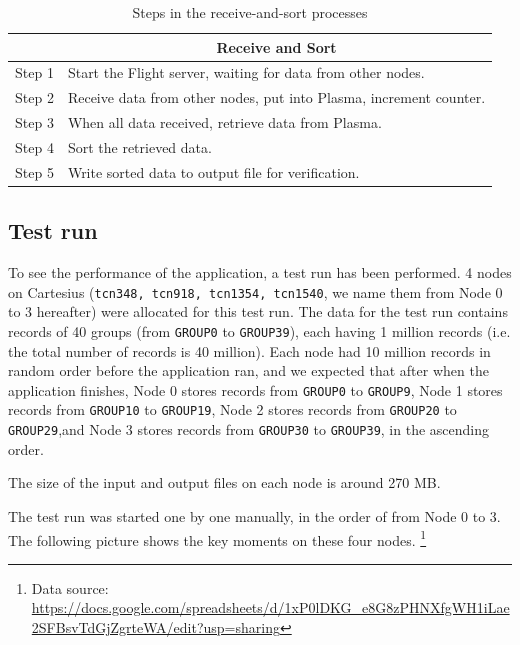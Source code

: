 \documentclass{article}
\begin{document}
\begin{table}[h!]
    \centering
    \begin{tabular}{|l|l|}
    \hline
           & \multicolumn{1}{c|}{\textbf{Receive and Sort}}                     \\ \hline
    Step 1 & Start the Flight server, waiting for data from other nodes.        \\ \hline
    Step 2 & Receive data from other nodes, put into Plasma, increment counter. \\ \hline
    Step 3 & When all data received, retrieve data from Plasma.                 \\ \hline
    Step 4 & Sort the retrieved data.                                           \\ \hline
    Step 5 & Write sorted data to output file for verification.                 \\ \hline
    \end{tabular}
    \caption{Steps in the receive-and-sort processes}
\end{table}

\subsection{Test run}
To see the performance of the application, a test run has been performed.
4 nodes on Cartesius (\texttt{tcn348, tcn918, tcn1354, tcn1540}, we name them from Node 0 to 3 hereafter) were allocated for this test run.
The data for the test run contains records of 40 groups (from \texttt{GROUP0} to \texttt{GROUP39}), each having 1 million records (i.e. the total number of records is 40 million).
Each node had 10 million records in random order before the application ran, and we expected that after when the application finishes,
Node 0 stores records from \texttt{GROUP0} to \texttt{GROUP9},
Node 1 stores records from \texttt{GROUP10} to \texttt{GROUP19},
Node 2 stores records from \texttt{GROUP20} to \texttt{GROUP29},and
Node 3 stores records from \texttt{GROUP30} to \texttt{GROUP39}, in the ascending order.

The size of the input and output files on each node is around 270 MB.

The test run was started one by one manually, in the order of from Node 0 to 3.
The following picture shows the key moments on these four nodes.
\footnote{Data source: \url{https://docs.google.com/spreadsheets/d/1xP0lDKG_e8G8zPHNXfgWH1iLae2SFBsvTdGjZgrteWA/edit?usp=sharing}}
\end{document}
